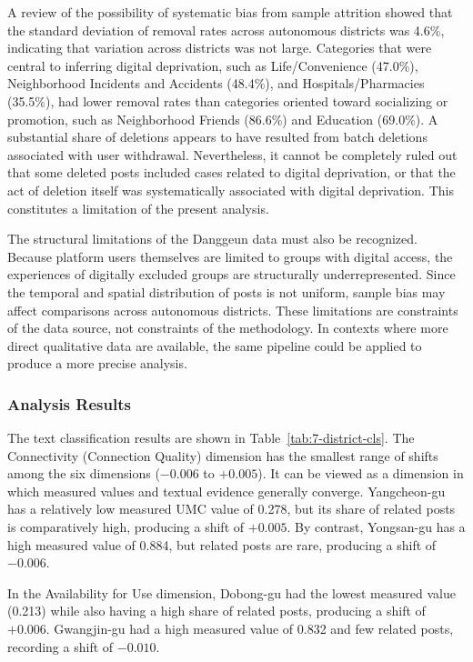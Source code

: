 A review of the possibility of systematic bias from sample attrition showed that the standard deviation of removal rates across autonomous districts was 4.6\%, indicating that variation across districts was not large. Categories that were central to inferring digital deprivation, such as Life/Convenience (47.0\%), Neighborhood Incidents and Accidents (48.4\%), and Hospitals/Pharmacies (35.5\%), had lower removal rates than categories oriented toward socializing or promotion, such as Neighborhood Friends (86.6\%) and Education (69.0\%). A substantial share of deletions appears to have resulted from batch deletions associated with user withdrawal. Nevertheless, it cannot be completely ruled out that some deleted posts included cases related to digital deprivation, or that the act of deletion itself was systematically associated with digital deprivation. This constitutes a limitation of the present analysis.

The structural limitations of the Danggeun data must also be recognized. Because platform users themselves are limited to groups with digital access, the experiences of digitally excluded groups are structurally underrepresented. Since the temporal and spatial distribution of posts is not uniform, sample bias may affect comparisons across autonomous districts. These limitations are constraints of the data source, not constraints of the methodology. In contexts where more direct qualitative data are available, the same pipeline could be applied to produce a more precise analysis.


\subsubsection{Analysis Results}
\label{subsubsec:3-3-5}

The text classification results are shown in Table~\ref{tab:7-district-cls}. The Connectivity (Connection Quality) dimension has the smallest range of shifts among the six dimensions ($-0.006$ to $+0.005$). It can be viewed as a dimension in which measured values and textual evidence generally converge. Yangcheon-gu has a relatively low measured UMC value of 0.278, but its share of related posts is comparatively high, producing a shift of $+0.005$. By contrast, Yongsan-gu has a high measured value of 0.884, but related posts are rare, producing a shift of $-0.006$.

In the Availability for Use dimension, Dobong-gu had the lowest measured value (0.213) while also having a high share of related posts, producing a shift of $+0.006$. Gwangjin-gu had a high measured value of 0.832 and few related posts, recording a shift of $-0.010$.

